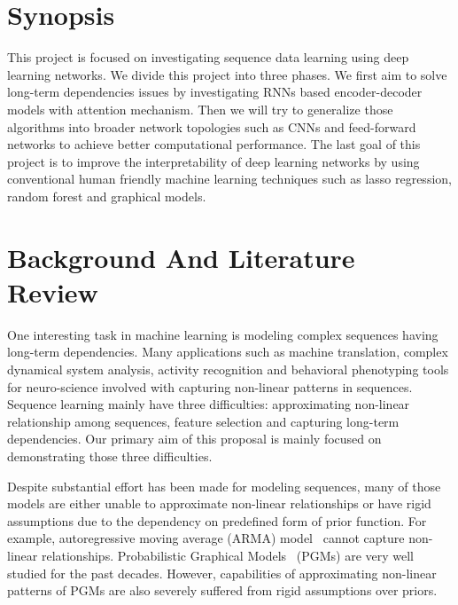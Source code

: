 \documentclass{article} \usepackage{tabularx}
\begin{document}
\section{Synopsis}
\label{sec:synop}

This project is focused on investigating sequence data learning
using deep learning networks. We divide this project into three
phases. We first aim to solve long-term dependencies issues by
investigating RNNs based encoder-decoder models with attention
mechanism. Then we will try to generalize those algorithms into
broader network topologies such as CNNs and feed-forward networks
to achieve better computational performance. The last goal of
this project is to improve the interpretability of deep learning
networks by using conventional human friendly machine learning
techniques such as lasso regression, random forest and graphical
models.

\section{Background And Literature Review}
\label{sec:intro}

One interesting task in machine learning is modeling complex
sequences having long-term dependencies. Many applications such
as machine translation, complex dynamical system analysis,
activity recognition and behavioral phenotyping tools for
neuro-science involved with capturing non-linear patterns in
sequences. Sequence learning mainly have three difficulties:
approximating non-linear relationship among sequences, feature
selection and capturing long-term dependencies. Our primary aim
of this proposal is mainly focused on demonstrating those three
difficulties. 

Despite substantial effort has been made for modeling sequences,
many of those models are either unable to approximate non-linear
relationships or have rigid assumptions due to the dependency on
predefined form of prior function. For example, autoregressive
moving average (ARMA) model~\cite{hibon1997arma} cannot capture
non-linear relationships. Probabilistic Graphical
Models~\cite{murphy2012machine,koller2009probabilistic} (PGMs)
are very well studied for the past decades. However, capabilities
of approximating non-linear patterns of PGMs are also severely
suffered from rigid assumptions over priors.
\end{document}
